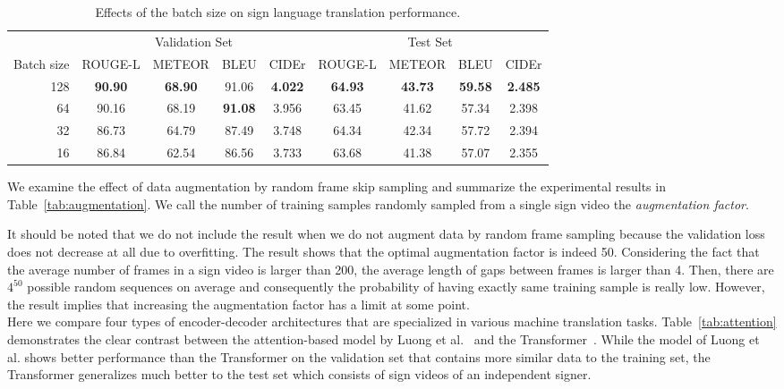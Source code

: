 \documentclass[10pt,twocolumn,letterpaper]{article}
\begin{document}
\begin{table*}[h!]
\centering
\begin{tabular}{@{ }rcccccccc@{ }}
\toprule
& \multicolumn{4}{c}{Validation Set} & \multicolumn{4}{c}{Test Set} \\
\cmidrule(lr){2-5} \cmidrule(lr){6-9}
Batch size    &   ROUGE-L & METEOR  & BLEU  & CIDEr &  ROUGE-L & METEOR  & BLEU & CIDEr\\
\midrule
128 & \textbf{90.90} & \textbf{68.90} & 91.06 & \textbf{4.022} & \textbf{64.93} & \textbf{43.73} & \textbf{59.58} & \textbf{2.485}\\
64 & 90.16 & 68.19 & \textbf{91.08} & 3.956 & 63.45 & 41.62 & 57.34 & 2.398\\
32 & 86.73 & 64.79 & 87.49 & 3.748 & 64.34 & 42.34 & 57.72 & 2.394\\
16 & 86.84 & 62.54 & 86.56 & 3.733 & 63.68 & 41.38 & 57.07 & 2.355\\
\bottomrule
\end{tabular}
\caption{Effects of the batch size on sign language translation performance.}
\label{tab:batch_size}
\end{table*}

We examine the effect of data augmentation by random frame skip sampling and summarize the experimental results in Table~\ref{tab:augmentation}. We call the number of training samples randomly sampled from a single sign video the {\em augmentation factor}.

It should be noted that we do not include the result when we do not augment data by random frame sampling because the validation loss does not decrease at all due to overfitting. The result shows that the optimal augmentation factor is indeed 50. Considering the fact that the average number of frames in a sign video is larger than 200, the average length of gaps between frames is larger than 4. Then, there are $4^{50}$ possible random sequences on average and consequently the probability of having exactly same training sample is really low. However, the result implies that increasing the augmentation factor has a limit at some point.\\

Here we compare four types of encoder-decoder architectures that are specialized in various machine translation tasks. Table~\ref{tab:attention} demonstrates the clear contrast between the attention-based model by Luong et al.~\cite{LuongPM15} and the Transformer~\cite{VaswaniSPUJGKP17}. While the model of Luong et al. shows better performance than the Transformer on the validation set that contains more similar data to the training set, the Transformer generalizes much better to the test set which consists of sign videos of an independent signer.
\\
\end{document}
